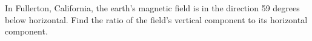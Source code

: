 In Fullerton, California, the earth's magnetic field is in the direction
59 degrees below horizontal. Find the ratio of the field's vertical component
to its horizontal component.
\answercheck\hwendpart
